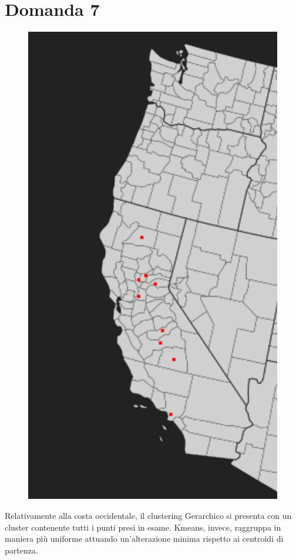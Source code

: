 \documentclass{article}
\begin{document}
\section*{Domanda 7} 
\begin{figure}
	\includegraphics[width=1.0\linewidth, valign=t]{figures/costa}
\end{figure} 
Relativamente alla costa occidentale, il clustering Gerarchico si presenta con un cluster contenente tutti i punti presi in esame. Kmeans, invece, raggruppa in maniera più uniforme attuando un'alterazione minima rispetto ai centroidi di partenza.
\end{document}

